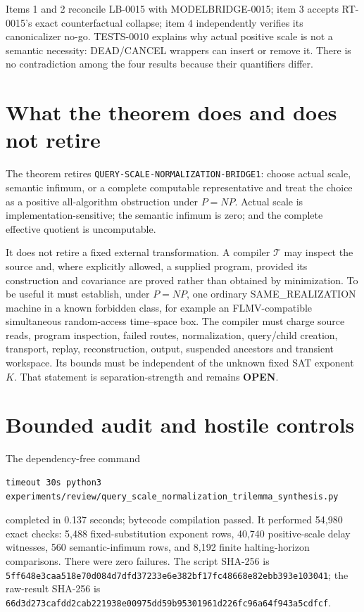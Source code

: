 \documentclass[11pt]{article}
\newcommand{\OPEN}{\textbf{OPEN}}
\begin{document}
Items 1 and 2 reconcile LB-0015 with MODELBRIDGE-0015; item 3 accepts
RT-0015's exact counterfactual collapse; item 4 independently verifies its
canonicalizer no-go.  TESTS-0010 explains why actual positive scale is not a
semantic necessity: DEAD/CANCEL wrappers can insert or remove it.  There is
no contradiction among the four results because their quantifiers differ.

\section{What the theorem does and does not retire}

The theorem retires \texttt{QUERY-SCALE-NORMALIZATION-BRIDGE1}: choose actual
scale, semantic infimum, or a complete computable representative and treat
the choice as a positive all-algorithm obstruction under $P=NP$.  Actual
scale is implementation-sensitive; the semantic infimum is zero; and the
complete effective quotient is uncomputable.

It does not retire a fixed external transformation.  A compiler
$\mathcal T$ may inspect the source and, where explicitly allowed, a supplied
program, provided its construction and covariance are proved rather than
obtained by minimization.  To be useful it must establish, under $P=NP$, one
ordinary SAME\_REALIZATION machine in a known forbidden class, for example
an FLMV-compatible simultaneous random-access time--space box.  The compiler
must charge source reads, program inspection, failed routes, normalization,
query/child creation, transport, replay, reconstruction, output, suspended
ancestors and transient workspace.  Its bounds must be independent of the
unknown fixed SAT exponent $K$.  That statement is separation-strength and
remains \OPEN.

\section{Bounded audit and hostile controls}

The dependency-free command
\begin{verbatim}
timeout 30s python3 experiments/review/query_scale_normalization_trilemma_synthesis.py
\end{verbatim}
completed in 0.137 seconds; bytecode compilation passed.  It performed
54,980 exact checks: 5,488 fixed-substitution exponent rows, 40,740
positive-scale delay witnesses, 560 semantic-infimum rows, and 8,192 finite
halting-horizon comparisons.  There were zero failures.  The script SHA-256
is
\nolinkurl{5ff648e3caa518e70d084d7dfd37233e6e382bf17fc48668e82ebb393e103041};
the raw-result SHA-256 is
\nolinkurl{66d3d273cafdd2cab221938e00975dd59b95301961d226fc96a64f943a5cdfcf}.
\end{document}
